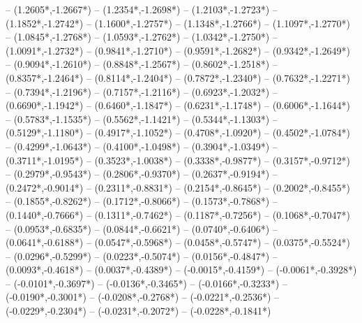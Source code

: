 {	-- ({1.2605*\dx},{-1.2667*\dy})
	-- ({1.2354*\dx},{-1.2698*\dy})
	-- ({1.2103*\dx},{-1.2723*\dy})
	-- ({1.1852*\dx},{-1.2742*\dy})
	-- ({1.1600*\dx},{-1.2757*\dy})
	-- ({1.1348*\dx},{-1.2766*\dy})
	-- ({1.1097*\dx},{-1.2770*\dy})
	-- ({1.0845*\dx},{-1.2768*\dy})
	-- ({1.0593*\dx},{-1.2762*\dy})
	-- ({1.0342*\dx},{-1.2750*\dy})
	-- ({1.0091*\dx},{-1.2732*\dy})
	-- ({0.9841*\dx},{-1.2710*\dy})
	-- ({0.9591*\dx},{-1.2682*\dy})
	-- ({0.9342*\dx},{-1.2649*\dy})
	-- ({0.9094*\dx},{-1.2610*\dy})
	-- ({0.8848*\dx},{-1.2567*\dy})
	-- ({0.8602*\dx},{-1.2518*\dy})
	-- ({0.8357*\dx},{-1.2464*\dy})
	-- ({0.8114*\dx},{-1.2404*\dy})
	-- ({0.7872*\dx},{-1.2340*\dy})
	-- ({0.7632*\dx},{-1.2271*\dy})
	-- ({0.7394*\dx},{-1.2196*\dy})
	-- ({0.7157*\dx},{-1.2116*\dy})
	-- ({0.6923*\dx},{-1.2032*\dy})
	-- ({0.6690*\dx},{-1.1942*\dy})
	-- ({0.6460*\dx},{-1.1847*\dy})
	-- ({0.6231*\dx},{-1.1748*\dy})
	-- ({0.6006*\dx},{-1.1644*\dy})
	-- ({0.5783*\dx},{-1.1535*\dy})
	-- ({0.5562*\dx},{-1.1421*\dy})
	-- ({0.5344*\dx},{-1.1303*\dy})
	-- ({0.5129*\dx},{-1.1180*\dy})
	-- ({0.4917*\dx},{-1.1052*\dy})
	-- ({0.4708*\dx},{-1.0920*\dy})
	-- ({0.4502*\dx},{-1.0784*\dy})
	-- ({0.4299*\dx},{-1.0643*\dy})
	-- ({0.4100*\dx},{-1.0498*\dy})
	-- ({0.3904*\dx},{-1.0349*\dy})
	-- ({0.3711*\dx},{-1.0195*\dy})
	-- ({0.3523*\dx},{-1.0038*\dy})
	-- ({0.3338*\dx},{-0.9877*\dy})
	-- ({0.3157*\dx},{-0.9712*\dy})
	-- ({0.2979*\dx},{-0.9543*\dy})
	-- ({0.2806*\dx},{-0.9370*\dy})
	-- ({0.2637*\dx},{-0.9194*\dy})
	-- ({0.2472*\dx},{-0.9014*\dy})
	-- ({0.2311*\dx},{-0.8831*\dy})
	-- ({0.2154*\dx},{-0.8645*\dy})
	-- ({0.2002*\dx},{-0.8455*\dy})
	-- ({0.1855*\dx},{-0.8262*\dy})
	-- ({0.1712*\dx},{-0.8066*\dy})
	-- ({0.1573*\dx},{-0.7868*\dy})
	-- ({0.1440*\dx},{-0.7666*\dy})
	-- ({0.1311*\dx},{-0.7462*\dy})
	-- ({0.1187*\dx},{-0.7256*\dy})
	-- ({0.1068*\dx},{-0.7047*\dy})
	-- ({0.0953*\dx},{-0.6835*\dy})
	-- ({0.0844*\dx},{-0.6621*\dy})
	-- ({0.0740*\dx},{-0.6406*\dy})
	-- ({0.0641*\dx},{-0.6188*\dy})
	-- ({0.0547*\dx},{-0.5968*\dy})
	-- ({0.0458*\dx},{-0.5747*\dy})
	-- ({0.0375*\dx},{-0.5524*\dy})
	-- ({0.0296*\dx},{-0.5299*\dy})
	-- ({0.0223*\dx},{-0.5074*\dy})
	-- ({0.0156*\dx},{-0.4847*\dy})
	-- ({0.0093*\dx},{-0.4618*\dy})
	-- ({0.0037*\dx},{-0.4389*\dy})
	-- ({-0.0015*\dx},{-0.4159*\dy})
	-- ({-0.0061*\dx},{-0.3928*\dy})
	-- ({-0.0101*\dx},{-0.3697*\dy})
	-- ({-0.0136*\dx},{-0.3465*\dy})
	-- ({-0.0166*\dx},{-0.3233*\dy})
	-- ({-0.0190*\dx},{-0.3001*\dy})
	-- ({-0.0208*\dx},{-0.2768*\dy})
	-- ({-0.0221*\dx},{-0.2536*\dy})
	-- ({-0.0229*\dx},{-0.2304*\dy})
	-- ({-0.0231*\dx},{-0.2072*\dy})
	-- ({-0.0228*\dx},{-0.1841*\dy})
}
